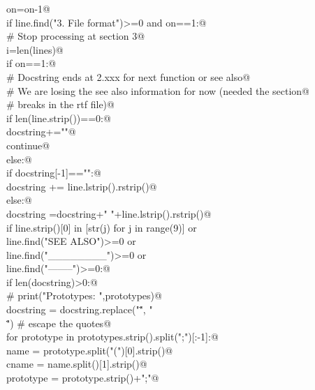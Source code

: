 \documentclass[10pt,a4paper,twoside,notitlepage]{article}
\begin{document}
\begin{flushleft}
\begin{list}{}{}
\mbox{}\verb@      on=on-1@\\
\mbox{}\verb@   if line.find("3. File format")>=0 and on==1:@\\
\mbox{}\verb@      # Stop processing at section 3@\\
\mbox{}\verb@      i=len(lines)@\\
\mbox{}\verb@   if on==1:@\\
\mbox{}\verb@      # Docstring ends at 2.xxx for next function or see also@\\
\mbox{}\verb@      # We are losing the see also information for now (needed the section@\\
\mbox{}\verb@      # breaks in the rtf file)@\\
\mbox{}\verb@      if len(line.strip())==0:@\\
\mbox{}\verb@         docstring+="\n"@\\
\mbox{}\verb@         continue@\\
\mbox{}\verb@      else:@\\
\mbox{}\verb@         if docstring[-1]=="\n":@\\
\mbox{}\verb@            docstring += line.lstrip().rstrip()@\\
\mbox{}\verb@         else:@\\
\mbox{}\verb@            docstring =docstring+" "+line.lstrip().rstrip()@\\
\mbox{}\verb@      if line.strip()[0] in [str(j) for j in range(9)] or \@\\
\mbox{}\verb@            line.find("SEE ALSO")>=0 or \@\\
\mbox{}\verb@            line.find("________")>=0 or \@\\
\mbox{}\verb@            line.find("--------")>=0:@\\
\mbox{}\verb@         if len(docstring)>0:@\\
\mbox{}\verb@            # print("Prototypes: ",prototypes)@\\
\mbox{}\verb@            docstring = docstring.replace("\"", " \\\"") # escape the quotes@\\
\mbox{}\verb@            for prototype in prototypes.strip().split(";")[:-1]:@\\
\mbox{}\verb@                name = prototype.split("(")[0].strip()@\\
\mbox{}\verb@                cname = name.split()[1].strip()@\\
\mbox{}\verb@                prototype = prototype.strip()+";"@\\

\end{list}
\end{flushleft}
\end{document}
